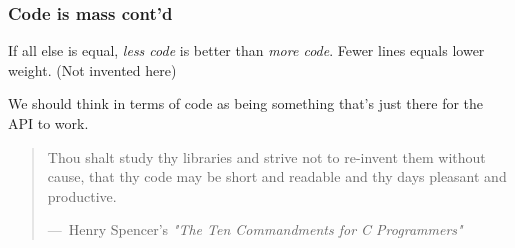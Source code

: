 \documentclass{beamer}
\newcommand{\bigpause}{\bigskip\pause}
\begin{document}
\begin{frame}
  \frametitle{Code is mass cont'd}

  If all else is equal, \emph{less code} is better than \emph{more code}.  Fewer
  lines equals lower weight.  (Not invented here)

  \bigpause

  We should think in terms of code as being something that's just there for the
  API to work.

  \bigpause

  \begin{quote}
    Thou shalt study thy libraries and strive not to re-invent them without
    cause, that thy code may be short and readable and thy days pleasant and
    productive.

    ---~Henry Spencer's \emph{"The Ten Commandments for C Programmers"}
  \end{quote}

\end{frame}
\end{document}
